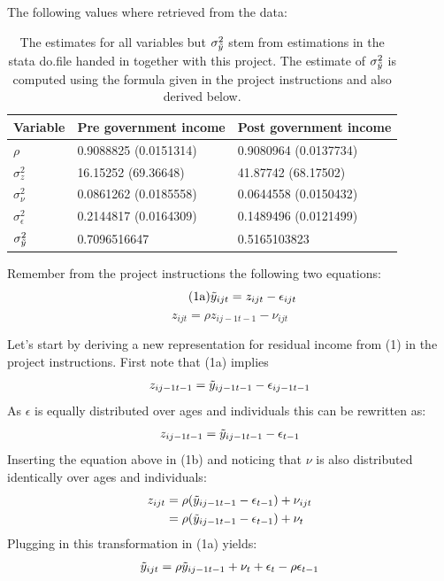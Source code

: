 \documentclass[12pt,a4paper]{article}
\begin{document}
The following values where retrieved from the data:

\begin{table}[h]
\begin{tabular}{|l|l|l|}
\hline
\textbf{Variable} & \textbf{Pre government income} & \textbf{Post government income}  \\ \hline
$\rho$                        &    0.9088825   (0.0151314)  &  0.9080964   (0.0137734)         \\ \hline
$\sigma^2_z$                  &   16.15252   (69.36648)  &  41.87742   (68.17502)        \\ \hline
$\sigma^2_\nu$                &   0.0861262   (0.0185558)  &   0.0644558   (0.0150432)        \\ \hline
$\sigma^2_\epsilon$           &   0.2144817   (0.0164309)  &   0.1489496   (0.0121499)        \\ \hline
$\sigma^2_{\Tilde{y}}$        &   0.7096516647             &   0.5165103823                   \\ \hline
\end{tabular}
\caption{The estimates for all variables but $\sigma^2_{\Tilde{y}}$ stem from estimations in the stata do.file handed in together with this project. The estimate of $\sigma^2_{\Tilde{y}}$ is computed using the formula given in the project instructions and also derived below.}
\end{table}

Remember from the project instructions the following two equations:
\begin{equation}\tag{1a}
    \Tilde{y}_{ijt} = z_{ijt} - \epsilon_{ijt}
\end{equation}
\begin{equation}\tag{1b}
    z_{ijt} = \rho z_{ij-1t-1} - \nu_{ijt}
\end{equation}

Let's start by deriving a new representation for residual income from (1) in the project instructions. First note that (1a) implies
\begin{align}
    z_{ij-1t-1} = \Tilde{y}_{ij-1t-1} - \epsilon_{ij-1t-1}
\end{align}
As $\epsilon$ is equally distributed over ages and individuals this can be rewritten as:
\begin{align}
    z_{ij-1t-1} = \Tilde{y}_{ij-1t-1} - \epsilon_{t-1}
\end{align}
Inserting the equation above in (1b) and noticing that $\nu$ is also distributed identically over ages and individuals:
\begin{align}
    z_{ijt} & = \rho(\Tilde{y}_{ij-1t-1} - \epsilon_{t-1}) + \nu_{ijt} \\
            & = \rho(\Tilde{y}_{ij-1t-1} - \epsilon_{t-1}) + \nu_{t}
\end{align}
Plugging in this transformation in (1a) yields:
\begin{align}
    \Tilde{y}_{ijt} = \rho\Tilde{y}_{ij-1t-1}  + \nu_{t} + \epsilon_t - \rho \epsilon_{t-1}
\end{align}
\end{document}

